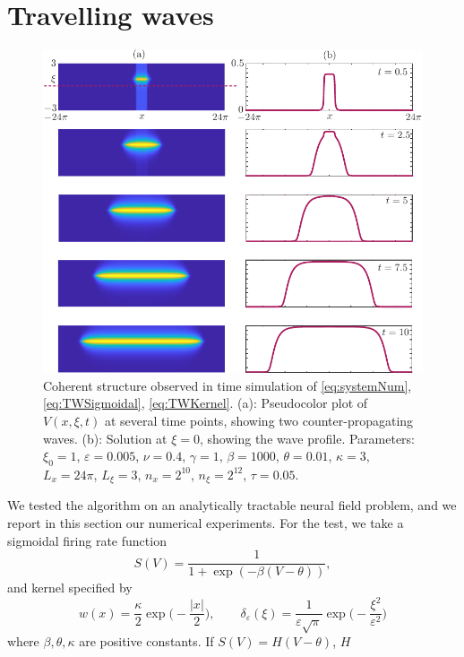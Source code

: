\documentclass[a4paper,final]{siamart190516}
\newcommand{\ep}{\varepsilon}
\begin{document}
\section{Travelling waves}\label{sec:TWTest}
\begin{figure}
  \centering
  \includegraphics{wave}
  \caption{ Coherent structure observed in time
    simulation of \eqref{eq:systemNum}, \eqref{eq:TWSigmoidal}, \eqref{eq:TWKernel}.
    (a): Pseudocolor plot of $V(x,\xi,t)$ at several time points, showing two
    counter-propagating waves. (b): Solution at $\xi = 0$, showing the wave
    profile. Parameters: $\xi_0 = 1$, $\ep = 0.005$, $\nu=0.4$, $\gamma=1$, $\beta=1000$,
    $\theta =0.01$, $\kappa =3$, $L_x = 24 \pi$, $L_\xi =3$, $n_x =
    2^{10}$, $n_\xi=2^{12}$, $\tau = 0.05$.}
    \label{fig:wave}
\end{figure}
We tested the algorithm on an analytically tractable neural field problem, and we
report in this section our numerical experiments. For the test, we take a sigmoidal
firing rate function
\begin{equation}\label{eq:TWSigmoidal}
  S(V) = \frac{1}{1 + \exp(-\beta(V-\theta))}, 
\end{equation}
and kernel specified by
\begin{equation}\label{eq:TWKernel}
  w(x) = \frac{\kappa}{2} \exp \bigg( -\frac{|x|}{2} \bigg),
  \qquad
  \delta_\ep(\xi) = \frac{1}{\ep
  \sqrt{\pi}} \exp\bigg(-\frac{\xi^2}{\ep^2}\bigg) 
\end{equation}
where $\beta, \theta, \kappa$ are positive constants. If $S(V) = H(V- \theta)$, $H$
\end{document}
